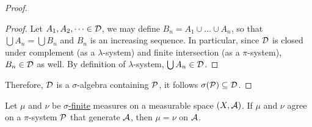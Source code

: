 \documentclass[11pt]{article}
\begin{document}
\begin{theorem}
\begin{proof}
\begin{tcolorbox}
\begin{proof}
					Let $A_1, A_2, \dots \in \mathcal{{D}}$, we may define $B_n = A_1 \cup \dots \cup A_n$, so that $\bigcup A_n = \bigcup B_n$ and $B_n$ is an increasing sequence. In particular, since $\mathcal{{D}}$ is closed under complement (as a $\lambda$-system) and finite intersection (as a $\pi$-system), $B_n \in \mathcal{{D}}$ as well.
					By definition of $\lambda$-system, $\bigcup A_n \in \mathcal{{D}}$.
				\end{proof}
			\end{tcolorbox}
			Therefore, $\mathcal{{D}}$ is a $\sigma$-algebra containing $\mathcal{{P}}$, it follows $\sigma(\mathcal{{P}}) \subseteq \mathcal{{D}}$.
		\end{proof}
	\end{theorem}
	
	\begin{corollary}
		Let $\mu$ and $\nu$ be \ul{$\sigma$-finite} measures on a measurable space $(X, \mathcal{{A}})$. If $\mu$ and $\nu$ agree on a $\pi$-system $\mathcal{{P}}$ that generate $\mathcal{{A}}$, then $\mu = \nu$ on $\mathcal{{A}}$.
	\end{corollary}
	
\end{document}
